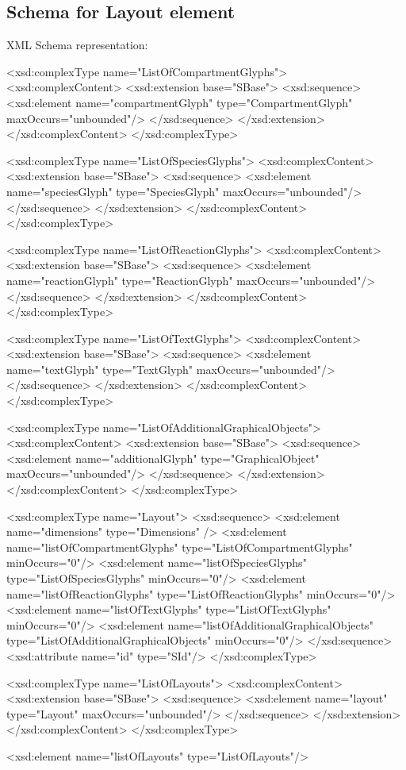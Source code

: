 \subsection{Schema for Layout element}
XML Schema representation:
\begin{example}
<xsd:complexType name="ListOfCompartmentGlyphs">
 <xsd:complexContent>
  <xsd:extension base="SBase">
   <xsd:sequence>
    <xsd:element name="compartmentGlyph" type="CompartmentGlyph" 
                 maxOccurs="unbounded"/>
   </xsd:sequence>
  </xsd:extension>
 </xsd:complexContent>
</xsd:complexType>

<xsd:complexType name="ListOfSpeciesGlyphs">
 <xsd:complexContent>
  <xsd:extension base="SBase">
   <xsd:sequence>
    <xsd:element name="speciesGlyph" type="SpeciesGlyph" 
                 maxOccurs="unbounded"/>
   </xsd:sequence>
  </xsd:extension>
 </xsd:complexContent>
</xsd:complexType>

<xsd:complexType name="ListOfReactionGlyphs">
 <xsd:complexContent>
  <xsd:extension base="SBase">
   <xsd:sequence>
    <xsd:element name="reactionGlyph" type="ReactionGlyph" 
                 maxOccurs="unbounded"/>
   </xsd:sequence>
  </xsd:extension>
 </xsd:complexContent>
</xsd:complexType>

<xsd:complexType name="ListOfTextGlyphs">
 <xsd:complexContent>
  <xsd:extension base="SBase">
   <xsd:sequence>
    <xsd:element name="textGlyph" type="TextGlyph" maxOccurs="unbounded"/>
   </xsd:sequence>
  </xsd:extension>
 </xsd:complexContent>
</xsd:complexType>

<xsd:complexType name="ListOfAdditionalGraphicalObjects">
 <xsd:complexContent>
  <xsd:extension base="SBase">
   <xsd:sequence>
    <xsd:element name="additionalGlyph" type="GraphicalObject" 
                 maxOccurs="unbounded"/>
   </xsd:sequence>
  </xsd:extension>
 </xsd:complexContent>
</xsd:complexType>

<xsd:complexType name="Layout">
  <xsd:sequence>
    <xsd:element name="dimensions" type="Dimensions" />
    <xsd:element name="listOfCompartmentGlyphs" type="ListOfCompartmentGlyphs" 
                 minOccurs="0"/>
    <xsd:element name="listOfSpeciesGlyphs" type="ListOfSpeciesGlyphs" 
                 minOccurs="0"/>
    <xsd:element name="listOfReactionGlyphs" type="ListOfReactionGlyphs" 
                 minOccurs="0"/>
    <xsd:element name="listOfTextGlyphs" type="ListOfTextGlyphs" 
                 minOccurs="0"/>
    <xsd:element name="listOfAdditionalGraphicalObjects" 
                 type="ListOfAdditionalGraphicalObjects" minOccurs="0"/>
   </xsd:sequence>
   <xsd:attribute name="id" type="SId"/>
</xsd:complexType>

<xsd:complexType name="ListOfLayouts">
 <xsd:complexContent>
  <xsd:extension base="SBase">
   <xsd:sequence>
    <xsd:element name="layout" type="Layout" maxOccurs="unbounded"/>
   </xsd:sequence>
  </xsd:extension>
 </xsd:complexContent> 
</xsd:complexType>

<xsd:element name="listOfLayouts" type="ListOfLayouts"/>

\end{example}


